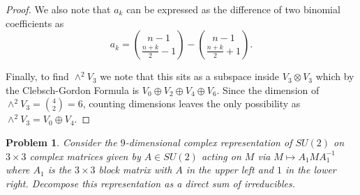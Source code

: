 \documentclass{article}
\newtheorem{problem}{Problem}
\begin{document}
\begin{proof}
We also note that $a_k$ can be expressed as the difference of two binomial coefficients as
\[
a_k = \binom{n-1}{\frac{n+k}{2} - 1} - \binom{n-1}{\frac{n+k}{2} + 1}.
\]

Finally, to find $\wedge^2 V_3$ we note that this sits as a subspace inside $V_3 \otimes V_3$ which by the Clebsch-Gordon Formula is $V_0 \oplus V_2 \oplus V_4 \oplus V_6$. Since the dimension of $\wedge^2 V_3 = \binom{4}{2} = 6$, counting dimensions leaves the only possibility as $\wedge^2 V_3 = V_0 \oplus V_4$.
\end{proof}

\begin{problem}
Consider the $9$-dimensional complex representation of $SU(2)$ on $3 \times 3$ complex matrices given by $A \in SU(2)$ acting on $M$ via $M \mapsto A_1MA_1^{-1}$ where $A_1$ is the $3 \times 3$ block matrix with $A$ in the upper left and $1$ in the lower right. Decompose this representation as a direct sum of irreducibles.
\end{problem}
\end{document}
